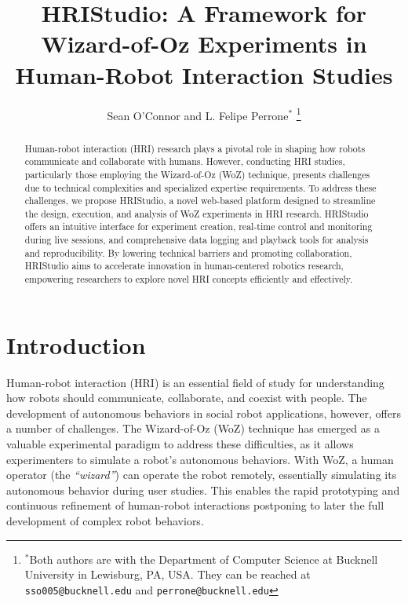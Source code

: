 \documentclass[letterpaper, 10 pt, conference]{ieeeconf}
\title{\LARGE \bf HRIStudio: A Framework for Wizard-of-Oz Experiments in Human-Robot Interaction Studies}
\author{Sean O'Connor and L. Felipe Perrone$^{*}$
    \thanks{$^{*}$Both authors are with the Department of Computer Science at
        Bucknell University in Lewisburg, PA, USA. They can be reached at {\tt\small sso005@bucknell.edu} and {\tt\small perrone@bucknell.edu}}%
}
\begin{document}
\maketitle
\thispagestyle{empty}
\pagestyle{empty}


\begin{abstract}

Human-robot interaction (HRI) research plays a pivotal role in shaping how robots communicate and collaborate with humans. However, conducting HRI studies, particularly those employing the Wizard-of-Oz (WoZ) technique, presents challenges due to technical complexities and specialized expertise requirements. To address these challenges, we propose HRIStudio, a novel web-based platform designed to streamline the design, execution, and analysis of WoZ experiments in HRI research. HRIStudio offers an intuitive interface for experiment creation, real-time control and monitoring during live sessions, and comprehensive data logging and playback tools for analysis and reproducibility. By lowering technical barriers and promoting collaboration, HRIStudio aims to accelerate innovation in human-centered robotics research, empowering researchers to explore novel HRI concepts efficiently and effectively.

\end{abstract}




\section{Introduction}

Human-robot interaction (HRI) is an essential field of study for understanding how robots should communicate, collaborate, and coexist with people. The development of autonomous behaviors in social robot applications, however, offers a number of challenges. The Wizard-of-Oz (WoZ) technique has emerged as a valuable experimental paradigm to address these difficulties, as it allows experimenters to simulate a robot's autonomous behaviors. With WoZ, a human operator (the \emph{``wizard''}) can operate the robot remotely, essentially simulating its autonomous behavior during user studies. This enables the rapid prototyping and continuous refinement of human-robot interactions postponing to later the full development of complex robot behaviors.
\end{document}

